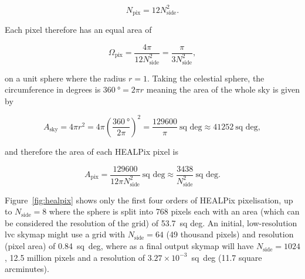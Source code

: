\begin{colsection}
\begin{colsection}
\begin{equation}
    N_\text{pix} = 12 N_\text{side}^2.
    \label{eq:healpix_npix}
\end{equation}

Each pixel therefore has an equal area of

\begin{equation}
    \Omega_\text{pix} = \frac{4\pi}{12 N_\text{side}^2} = \frac{\pi}{3 N_\text{side}^2},
    \label{eq:healpix_area}
\end{equation}

on a unit sphere where the radius $r=1$. Taking the celestial sphere, the circumference in degrees is $\SI{360}{\degree} = 2 \pi r$ meaning the area of the whole sky is given by

\begin{equation}
    A_\text{sky} = 4 \pi r^2 = 4 \pi \left ( \frac{\SI{360}{\degree}}{2 \pi} \right )^2 = \frac{129600}{\pi}~\text{sq deg} \approx 41252~\text{sq deg} , %
    \label{eq:sky_area}
\end{equation}

and therefore the area of each HEALPix pixel is

\begin{equation}
    A_\text{pix} = \frac{129600}{12 \pi N_\text{side}^2}~\text{sq~deg} \approx \frac{3438}{N_\text{side}^2}~\text{sq~deg}.
    \label{eq:healpix_area_degrees}
\end{equation}

Figure~\ref{fig:healpix} shows only the first four orders of HEALPix pixelisation, up to $N_\text{side} = 8$ where the sphere is split into 768 pixels each with an area (which can be considered the resolution of the grid) of 53.7~sq deg. An initial, low-resolution \gls{lvc} skymap might use a grid with $N_\text{side} = 64$ (49 thousand pixels) and resolution (pixel area) of 0.84~sq~deg, where as a final output skymap will have $N_\text{side} = 1024$, 12.5 million pixels and a resolution of $3.27 \times 10^{-3}$~sq~deg (11.7 square arcminutes).



\end{colsection}
\end{colsection}
